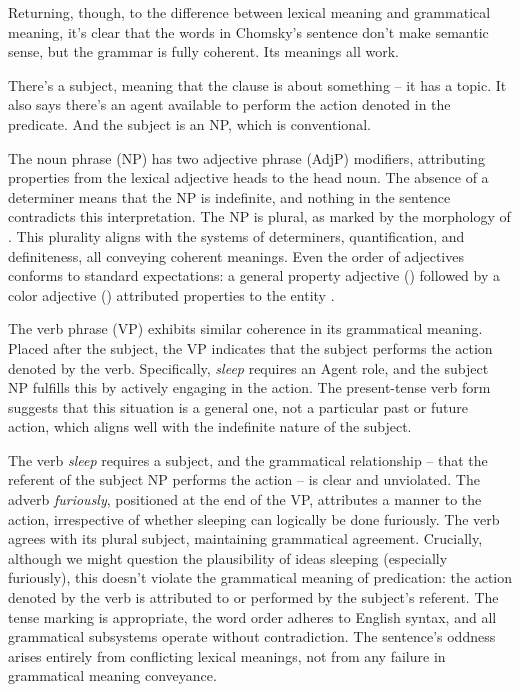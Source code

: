 Returning, though, to the difference between lexical meaning and grammatical meaning, it's clear that the words in Chomsky's sentence don't make semantic sense, but the grammar is fully coherent. Its meanings all work.

There's a subject, meaning that the clause is about something -- it has a topic. It also says there's an agent available to perform the action denoted in the predicate. And the subject is an NP, which is conventional.

The noun phrase (NP) has two adjective phrase (AdjP) modifiers, attributing properties from the lexical adjective heads to the head noun. The absence of a determiner means that the NP is indefinite, and nothing in the sentence contradicts this interpretation. The NP is plural, as marked by the morphology of . This plurality aligns with the systems of determiners, quantification, and definiteness, all conveying coherent meanings. Even the order of adjectives conforms to standard expectations: a general property adjective () followed by a color adjective () attributed properties to the entity .

The verb phrase (VP) exhibits similar coherence in its grammatical meaning. Placed after the subject, the VP indicates that the subject performs the action denoted by the verb. Specifically, \textit{sleep} requires an Agent role, and the subject NP fulfills this by actively engaging in the action. The present-tense verb form suggests that this situation is a general one, not a particular past or future action, which aligns well with the indefinite nature of the subject.

The verb \textit{sleep} requires a subject, and the grammatical relationship -- that the referent of the subject NP performs the action -- is clear and unviolated. The adverb \textit{furiously}, positioned at the end of the VP, attributes a manner to the action, irrespective of whether sleeping can logically be done furiously. The verb agrees with its plural subject, maintaining grammatical agreement. Crucially, although we might question the plausibility of ideas sleeping (especially furiously), this doesn't violate the grammatical meaning of predication: the action denoted by the verb is attributed to or performed by the subject's referent. The tense marking is appropriate, the word order adheres to English syntax, and all grammatical subsystems operate without contradiction. The sentence's oddness arises entirely from conflicting lexical meanings, not from any failure in grammatical meaning conveyance.

